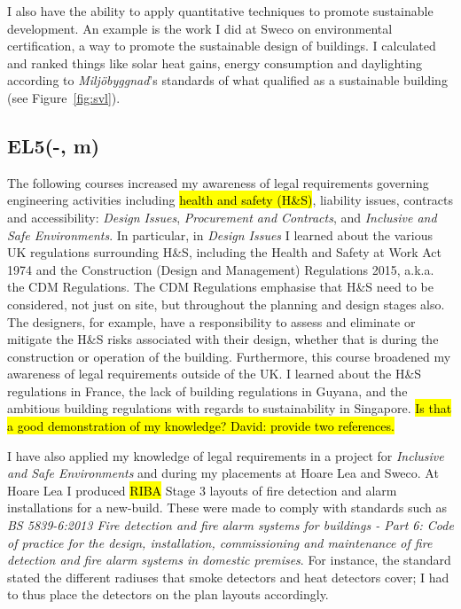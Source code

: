 I also have the ability to apply quantitative techniques to promote sustainable development.
An example is the work I did at Sweco on environmental certification, a way to promote the sustainable design of buildings.
I calculated and ranked things like solar heat gains, energy consumption and daylighting according to \textit{Miljöbyggnad}'s standards of what qualified as a sustainable building (see Figure~\ref{fig:svl}).





\subsection*{EL5(-, m)}

The following courses increased my awareness of legal requirements governing engineering activities including \hl{health and safety (H\&S)}, liability issues, contracts and accessibility:
\textit{Design Issues},
\textit{Procurement and Contracts},
and \textit{Inclusive and Safe Environments}.
In particular, in \textit{Design Issues} I learned about the various UK regulations surrounding H\&S, including the Health and Safety at Work Act 1974 and the Construction (Design and Management) Regulations 2015, a.k.a. the CDM Regulations.
The CDM Regulations emphasise that H\&S need to be considered, not just on site, but throughout the planning and design stages also.
The designers, for example, have a responsibility to assess and eliminate or mitigate the H\&S risks associated with their design, whether that is during the construction or operation of the building.
Furthermore, this course broadened my awareness of legal requirements outside of the UK.
I learned about the H\&S regulations in France, the lack of building regulations in Guyana, and the ambitious building regulations with regards to sustainability in Singapore.
\hl{Is that a good demonstration of my knowledge? David: provide two references.}

I have also applied my knowledge of legal requirements in a project for \textit{Inclusive and Safe Environments} and during my placements at Hoare Lea and Sweco.
At Hoare Lea I produced \hl{RIBA} Stage 3 layouts of fire detection and alarm installations for a new-build.
These were made to comply with standards such as \textit{BS 5839-6:2013 Fire detection and fire alarm systems for buildings - Part 6: Code of practice for the design, installation, commissioning and maintenance of fire detection and fire alarm systems in domestic premises}.
For instance, the standard stated the different radiuses that smoke detectors and heat detectors cover; I had to thus place the detectors on the plan layouts accordingly.


